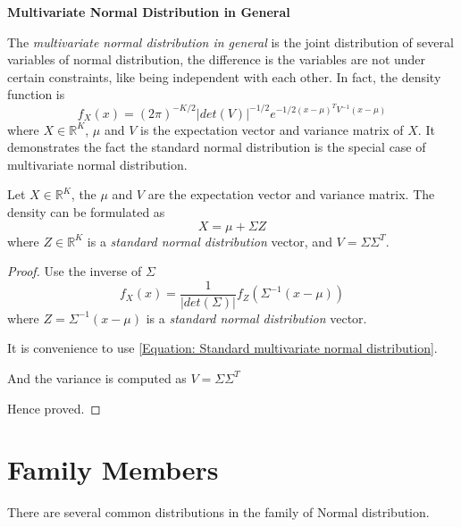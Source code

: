 \textbf{Multivariate Normal Distribution in General}

The \emph{multivariate normal distribution in general} is the joint distribution of several variables of normal distribution,
the difference is the variables are not under certain constraints, like being independent with each other.
In fact, the density function is
\begin{equation}
    \label{Equation: Multivariate normal distribution}
    f_X(x) = (2 \pi)^{-K/2} |det(V)|^{-1/2}
    e^{-1/2 (x-\mu)^T V^{-1} (x-\mu)}
\end{equation}
where $X \in \mathbb{R}^K$, $\mu$ and $V$ is the expectation vector and variance matrix of $X$.
It demonstrates the fact the standard normal distribution is the special case of multivariate normal distribution.

\begin{proposition}
    \label{Proposition: Joint Density of Linear Combination}
    Let $X \in \mathbb{R}^K$, the $\mu$ and $V$ are the expectation vector and variance matrix.
    The density can be formulated as
    \begin{equation*}
        X = \mu + \Sigma Z
    \end{equation*}
    where $Z \in \mathbb{R}^K$ is a \emph{standard normal distribution} vector,
    and $V = \Sigma \Sigma^T$.

    \begin{proof}
        Use the inverse of $\Sigma$
        \begin{equation*}
            f_X(x) = \frac{1}{|det(\Sigma)|} f_Z(\Sigma^{-1} (x - \mu))
        \end{equation*}
        where $Z = \Sigma^{-1} (x - \mu)$ is a \emph{standard normal distribution} vector.

        It is convenience to use \eqref{Equation: Standard multivariate normal distribution}.

        And the variance is computed as $V = \Sigma \Sigma^T$

        Hence proved.
    \end{proof}

\end{proposition}

\section{Family Members}
There are several common distributions in the family of Normal distribution.

